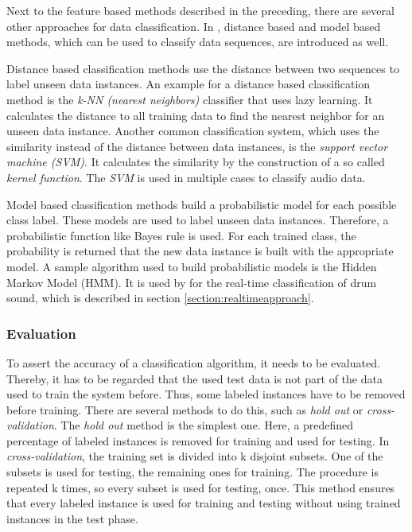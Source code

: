 Next to the feature based methods described in the preceding, there are several other approaches for data classification. In \autocite{Chapman:2015}, distance based and model based methods, which can be used to classify data sequences, are introduced as well.

Distance based classification methods use the distance between two sequences to label unseen data instances. An example for a distance based classification method is the \textit{k-NN (nearest neighbors)} classifier that uses lazy learning. It calculates the distance to all training data to find the nearest neighbor for an unseen data instance. Another common classification system, which uses the similarity instead of the distance between data instances, is the \textit{support vector machine (SVM)}. It calculates the similarity by the construction of a so called \textit{kernel function}. The \textit{SVM} is used in multiple cases to classify audio data.

Model based classification methods build a probabilistic model for each possible class label. These models are used to label unseen data instances. Therefore, a probabilistic function like Bayes rule is used. For each trained class, the probability  is returned that the new data instance is built with the appropriate model. A sample algorithm used to build probabilistic models is the Hidden Markov Model (HMM). It is used by \autocite{Simsekli:2011} for the real-time classification of drum sound, which is described in section \ref{section:realtimeapproach}.

\subsubsection{Evaluation}

To assert the accuracy of a classification algorithm, it needs to be evaluated. Thereby, it has to be regarded that the used test data is not part of the data used to train the system before. Thus, some labeled instances have to be removed before training. There are several methods to do this, such as \textit{hold out} or \textit{cross-validation}. The \textit{hold out} method is the simplest one. Here, a predefined percentage of labeled instances is removed for training and used for testing. In \textit{cross-validation}, the training set is divided into k disjoint subsets. One of the subsets is used for testing, the remaining ones for training. The procedure is repeated k times, so every subset is used for testing, once. This method ensures that every labeled instance is used for training and testing without using trained instances in the test phase.


